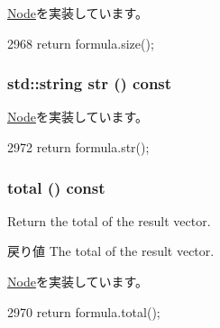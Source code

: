 \hyperlink{classStats_1_1Node_a4051d143efd31726fa13df03ae4e1bce}{Node}を実装しています。


\begin{DoxyCode}
2968 { return formula.size(); }
\end{DoxyCode}
\hypertarget{classStats_1_1FormulaNode_a1b9b8885b0880fc4ddf9a2c7d1ca3dc4}{
\subsubsection[{str}]{\setlength{\rightskip}{0pt plus 5cm}std::string str () const}}
\label{classStats_1_1FormulaNode_a1b9b8885b0880fc4ddf9a2c7d1ca3dc4}


\hyperlink{classStats_1_1Node_a6522bc65bd97a6b1ef6cdfe78462a919}{Node}を実装しています。


\begin{DoxyCode}
2972 { return formula.str(); }
\end{DoxyCode}
\hypertarget{classStats_1_1FormulaNode_a35c6e2ed3fc81b40d69052a062113ead}{
\subsubsection[{total}]{ total () const}}
\label{classStats_1_1FormulaNode_a35c6e2ed3fc81b40d69052a062113ead}
Return the total of the result vector. \begin{DoxyReturn}{戻り値}
The total of the result vector. 
\end{DoxyReturn}


\hyperlink{classStats_1_1Node_ab152b7e89b37a7db03b04d500ceb8349}{Node}を実装しています。


\begin{DoxyCode}
2970 { return formula.total(); }
\end{DoxyCode}


